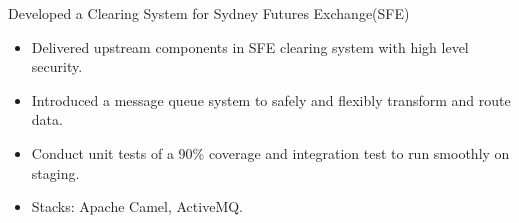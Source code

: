 \documentclass{resume}
\begin{document}

Developed a Clearing System for Sydney Futures Exchange(SFE)
\begin{itemize}
  \item Delivered upstream components in SFE clearing system with high level security.
  \item Introduced a message queue system to safely and flexibly transform and route data.
  \item Conduct unit tests of a 90\% coverage and integration test to run smoothly on staging.
  \item Stacks: Apache Camel, ActiveMQ.
\end{itemize}




%
%
\end{document}
